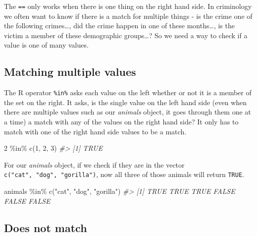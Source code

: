 \documentclass[
]{krantz}
\makeatletter
\newenvironment{Shaded}{\begin{snugshade}}{\end{snugshade}}
\newcommand{\CommentTok}[1]{\textcolor[rgb]{0.37,0.37,0.37}{\textit{#1}}}
\newcommand{\DecValTok}[1]{\textcolor[rgb]{0.06,0.06,0.06}{#1}}
\newcommand{\FunctionTok}[1]{\textcolor[rgb]{0,0,0}{#1}}
\newcommand{\NormalTok}[1]{#1}
\newcommand{\SpecialCharTok}[1]{\textcolor[rgb]{0,0,0}{#1}}
\newcommand{\StringTok}[1]{\textcolor[rgb]{0.5,0.5,0.5}{#1}}
\newenvironment{kframe}{%
\medskip{}
\setlength{\fboxsep}{.8em}
 \def\at@end@of@kframe{}%
 \ifinner\ifhmode%
  \def\at@end@of@kframe{\end{minipage}}%
  \begin{minipage}{\columnwidth}%
 \fi\fi%
 \def\FrameCommand##1{\hskip\@totalleftmargin \hskip-\fboxsep
 \colorbox{shadecolor}{##1}\hskip-\fboxsep
     \hskip-\linewidth \hskip-\@totalleftmargin \hskip\columnwidth}%
 \MakeFramed {\advance\hsize-\width
   \@totalleftmargin\z@ \linewidth\hsize
   \@setminipage}}%
 {\par\unskip\endMakeFramed%
 \at@end@of@kframe}
\renewenvironment{Shaded}{\begin{kframe}}{\end{kframe}}
\makeatother
\begin{document}
The \texttt{==} only works when there is one thing on the right hand side. In criminology we often want to know if there is a match for multiple things - is the crime one of the following crimes\ldots, did the crime happen in one of these months\ldots, is the victim a member of these demographic groups\ldots? So we need a way to check if a value is one of many values.

\hypertarget{matching-multiple-values}{%
\subsection{Matching multiple values}\label{matching-multiple-values}}

The R operator \texttt{\%in\%} asks each value on the left whether or not it is a member of the set on the right. It asks, is the single value on the left hand side (even when there are multiple values such as our \emph{animals} object, it goes through them one at a time) a match with any of the values on the right hand side? It only has to match with one of the right hand side values to be a match.

\begin{Shaded}
\begin{Highlighting}[]
\DecValTok{2} \SpecialCharTok{\%in\%} \FunctionTok{c}\NormalTok{(}\DecValTok{1}\NormalTok{, }\DecValTok{2}\NormalTok{, }\DecValTok{3}\NormalTok{)}
\CommentTok{\#\textgreater{} [1] TRUE}
\end{Highlighting}
\end{Shaded}

For our \emph{animals} object, if we check if they are in the vector \texttt{c("cat",\ "dog",\ "gorilla")}, now all three of those animals will return \texttt{TRUE}.

\begin{Shaded}
\begin{Highlighting}[]
\NormalTok{animals }\SpecialCharTok{\%in\%} \FunctionTok{c}\NormalTok{(}\StringTok{"cat"}\NormalTok{, }\StringTok{"dog"}\NormalTok{, }\StringTok{"gorilla"}\NormalTok{)}
\CommentTok{\#\textgreater{} [1]  TRUE  TRUE  TRUE FALSE FALSE FALSE}
\end{Highlighting}
\end{Shaded}

\hypertarget{does-not-match}{%
\subsection{Does not match}\label{does-not-match}}
\end{document}
